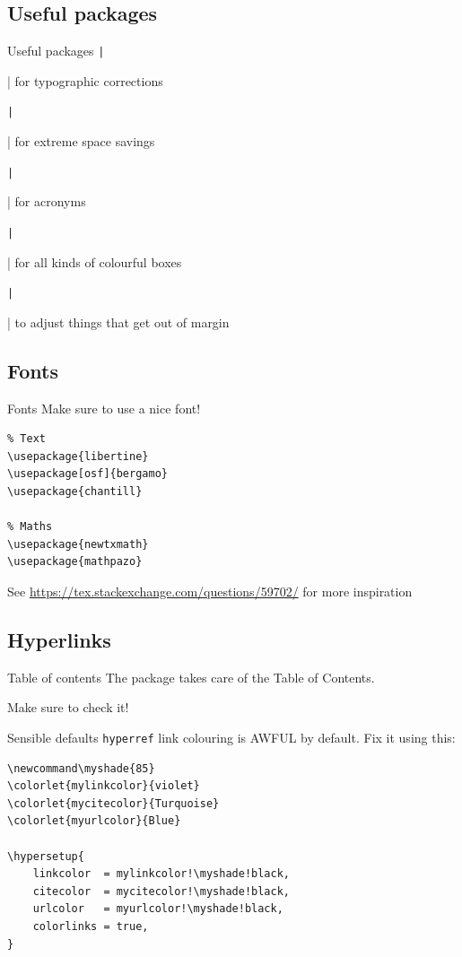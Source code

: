 \documentclass[aspectratio=169]{beamer}
\begin{document}
	\subsection{Useful packages}
	
	\begin{frame}{Useful packages}
		\centering
		\texttt|\usepackage{microtype}| for typographic corrections
		
		\texttt|\usepackage{savetrees}| for extreme space savings
		
		\texttt|\usepackage{acro}| for acronyms
		
		\texttt|\usepackage{tcolorbox}| for all kinds of colourful boxes
		
		\texttt|\usepackage{adjustbox}| to adjust things that get out of margin
	\end{frame}

	\subsection{Fonts}
	
	\begin{frame}[fragile]{Fonts}
	Make sure to use a nice font!
	
\begin{verbatim}
% Text
\usepackage{libertine}
\usepackage[osf]{bergamo}
\usepackage{chantill}

% Maths
\usepackage{newtxmath}
\usepackage{mathpazo}
\end{verbatim}

	\tiny
	See \url{https://tex.stackexchange.com/questions/59702/} for more inspiration
	\end{frame}

	\subsection{Hyperlinks}
	\begin{frame}{Table of contents}
		The  package takes care of the Table of Contents. 
		
		Make sure to check it!
	\end{frame}

	\begin{frame}[fragile]{Sensible defaults}
		\texttt{hyperref} link colouring is AWFUL by default. Fix it using this:
	
\begin{verbatim}
\newcommand\myshade{85}
\colorlet{mylinkcolor}{violet}
\colorlet{mycitecolor}{Turquoise}
\colorlet{myurlcolor}{Blue}

\hypersetup{
    linkcolor  = mylinkcolor!\myshade!black,
    citecolor  = mycitecolor!\myshade!black,
    urlcolor   = myurlcolor!\myshade!black,
    colorlinks = true,
}
\end{verbatim}
	\end{frame}
	
\end{document}
